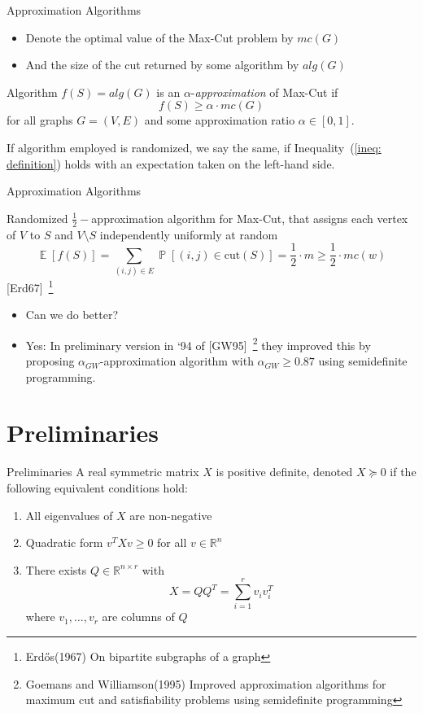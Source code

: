 \documentclass[10pt, xcolor={dvipsnames}]{beamer}
\DeclareMathOperator{\Ex}{\mathbb{E}}
\DeclareMathOperator{\Prob}{\mathbb{P}}
\begin{document}
\begin{frame}{Approximation Algorithms}
\begin{itemize}
\item Denote the optimal value of the Max-Cut problem by $mc(G)$
\item And the size of the cut returned by some algorithm by $alg(G)$
\end{itemize}
\begin{definition}
Algorithm $f(S) = alg(G)$ is an $\alpha$-{\it approximation} of Max-Cut if
\begin{equation}
f(S) \geq \alpha \cdot mc(G)
\label{ineq: definition}
\end{equation}
for all graphs $G = (V, E)$ and some approximation ratio $\alpha \in [0, 1]$.
\end{definition}
If algorithm employed is randomized, we say the same, if Inequality~(\ref{ineq: definition}) holds with an expectation taken on the left-hand side.
\end{frame}

\begin{frame}{Approximation Algorithms}
\begin{example}
Randomized $\frac{1}{2}-$approximation algorithm for Max-Cut, that assigns each vertex of $V$ to $S$ and $V \setminus S$ independently uniformly at random
\begin{equation}
\Ex[f(S)] = \sum_{(i, j) \in E} \Prob[(i, j) \in \text{cut}(S)] = \frac{1}{2} \cdot m \geq \frac{1}{2} \cdot mc(w)
\end{equation}
[Erd67]~\footnote{Erdős(1967) On bipartite subgraphs of a graph}
\end{example}
\begin{itemize}
\item Can we do better?
\item Yes: In preliminary version in `94 of [GW95]~\footnote{Goemans and Williamson(1995) Improved approximation algorithms for maximum cut and
satisfiability problems using semidefinite programming} they improved this by proposing $\alpha_{GW}$-approximation algorithm with $\alpha_{GW} \geq 0.87$ using semidefinite programming.
\end{itemize}
\end{frame}

\section{Preliminaries}
\begin{frame}{Preliminaries}
A real symmetric matrix $X$ is positive definite, denoted $X \succeq 0$ if the following equivalent conditions hold:
\begin{enumerate}
\item All eigenvalues of $X$ are non-negative
\item Quadratic form $v^{T}Xv \geq 0$ for all $v \in \mathbb{R}^{n}$
\item There exists $Q \in \mathbb{R}^{n \times r}$ with 
$$
X = QQ^{T} = \sum_{i = 1}^{r} v_{i} v_{i}^{T}
$$
where $v_{1}, \dots, v_{r}$ are columns of $Q$
\end{enumerate}
\end{frame}
\end{document}
